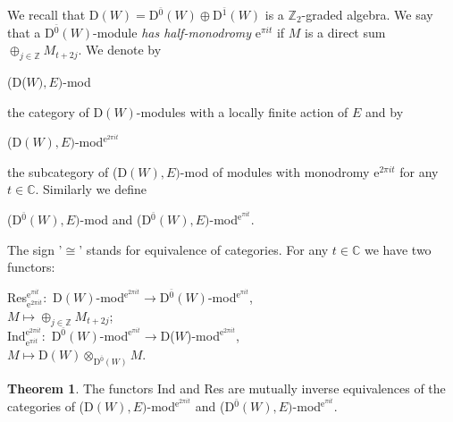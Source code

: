 \documentclass[12pt]{amsart}
\theoremstyle{definition}\newtheorem{theorem}{Theorem}[section]
\theoremstyle{definition}\newtheorem{definition}[proposition]{Definition}
\theoremstyle{remark}\newtheorem{example}[proposition]{Example}
\renewcommand{\to}[1][]{\xrightarrow{#1}}
\begin{document}
We recall that D$(W)=$D$^{\bar0}(W)\oplus$D$^{\bar1}(W)$ is a
$\mathbb Z_2$-graded algebra. We say that a D$^{\bar 0}(W)$-module
{\it has half-monodromy} e$^{\pi it}$ if $M$ is a direct sum
$\oplus_{j\in\mathbb Z}M_{t+2j}$. We denote by \begin{center}(D($W),
E)$-mod\end{center} the category of D$(W)$-modules with a locally
finite action of $E$ and by \begin{center}(D$(W), E)$-mod$^{\mathrm
e^{2\pi it}}$\end{center} the subcategory of (D$(W), E)$-mod of
modules with monodromy e$^{2\pi it}$ for any $t\in\mathbb C$.
Similarly we define \begin{center}(D$^{\bar 0}(W), E)$-mod and
(D$^{\bar 0}(W), E)$-mod$^{\mathrm e^{\pi it}}$.\end{center} The
sign '$\cong$' stands for equivalence of categories. For any
$t\in\mathbb C$ we have two functors:
\begin{center}Res$_{\mathrm e^{2\pi it}}^{\mathrm e^{\pi it}}:$ D$(W)$-mod$^{\mathrm e^{2\pi it}}\to$D$^{\bar 0}(W)$-mod$^{\mathrm e^{\pi it}}$,\\
$M\mapsto \oplus_{j\in\mathbb Z}M_{t+2j}$;\\
Ind$_{\mathrm e^{\pi it}}^{\mathrm e^{2\pi it}}:$ D$^{\bar 0}(W)$-mod$^{\mathrm e^{\pi it}}\to$D($W$)-mod$^{\mathrm e^{2\pi it}}$,\\
$M\mapsto$D$(W)\otimes_{\mathrm D^{\bar 0}(W)}M$.\end{center}
\begin{theorem}The functors Ind and Res are mutually inverse equivalences of the categories of (D$(W), E)$-mod$^{\mathrm e^{2\pi it}}$ and (D$^{\bar 0}(W), E)$-mod$^{\mathrm e^{\pi it}}$.\end{theorem}
\end{document}

